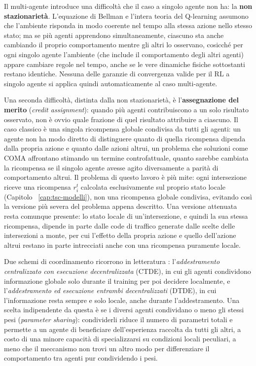 Il multi-agente introduce una difficoltà che il caso a singolo agente non
ha: la \textbf{non stazionarietà}. L'equazione di Bellman e l'intera teoria
del Q-learning assumono che l'ambiente risponda in modo coerente nel
tempo alla stessa azione nello stesso stato; ma se più agenti apprendono
simultaneamente, ciascuno sta anche cambiando il proprio comportamento
mentre gli altri lo osservano, cosicché per ogni singolo agente
l'ambiente (che include il comportamento degli altri agenti) appare
cambiare regole nel tempo, anche se le vere dinamiche fisiche sottostanti
restano identiche. Nessuna delle garanzie di convergenza valide per il RL
a singolo agente si applica quindi automaticamente al caso multi-agente.

Una seconda difficoltà, distinta dalla non stazionarietà, è
l'\textbf{assegnazione del merito} (\emph{credit assignment}): quando più
agenti contribuiscono a un solo risultato osservato, non è ovvio quale
frazione di quel risultato attribuire a ciascuno. Il caso classico è una
singola ricompensa globale condivisa da tutti gli agenti: un agente non ha
modo diretto di distinguere quanto di quella ricompensa dipenda dalla
propria azione e quanto dalle azioni altrui, un problema che soluzioni
come COMA \citep{li2018drlsurvey} affrontano stimando un termine
controfattuale, quanto sarebbe cambiata la ricompensa se il singolo agente
avesse agito diversamente a parità di comportamento altrui. Il problema di
questo lavoro è più mite: ogni intersezione riceve una ricompensa $r_i^t$
calcolata esclusivamente sul proprio stato locale (Capitolo~%
\ref{cap:tsc-modelli}), non una ricompensa globale condivisa, evitando così
la versione più severa del problema appena descritto. Una versione
attenuata resta comunque presente: lo stato locale di un'intersezione, e
quindi la sua stessa ricompensa, dipende in parte dalle code di traffico
generate dalle scelte delle intersezioni a monte, per cui
l'effetto della propria azione e quello dell'azione altrui restano in
parte intrecciati anche con una ricompensa puramente locale.

Due schemi di coordinamento ricorrono in letteratura
\citep{li2018drlsurvey}: l'\emph{addestramento centralizzato con
esecuzione decentralizzata} (CTDE), in cui gli agenti condividono
informazione globale solo durante il training per poi decidere
localmente, e l'\emph{addestramento ed esecuzione entrambi
decentralizzati} (DTDE), in cui l'informazione resta sempre e solo
locale, anche durante l'addestramento. Una scelta indipendente da questa
è se i diversi agenti condividano o meno gli stessi pesi (\emph{parameter
sharing}): condividerli riduce il numero di parametri totali e permette a
un agente di beneficiare dell'esperienza raccolta da tutti gli altri, a
costo di una minore capacità di specializzarsi su condizioni locali
peculiari, a meno che il meccanismo non trovi un altro modo per
differenziare il comportamento tra agenti pur condividendo i pesi.

